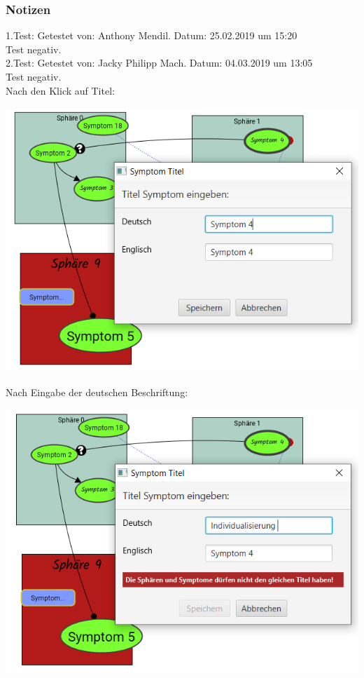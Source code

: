 \documentclass[enabledeprecatedfontcommands]{scrartcl}
\begin{document}
\subsubsection{Notizen}
1.Test: Getestet von: Anthony Mendil. Datum: 25.02.2019 um 15:20 \\
Test negativ. \\
2.Test: Getestet von: Jacky Philipp Mach. Datum: 04.03.2019 um 13:05 \\
Test negativ.\\
Nach den Klick auf Titel: 
\begin{center}
\includegraphics[height=10cm]{3_46vorher.PNG}
\end{center}
Nach Eingabe der deutschen Beschriftung:
\begin{center}
\includegraphics[height=10cm]{3_46nachher.PNG}
\end{center}
\end{document}
